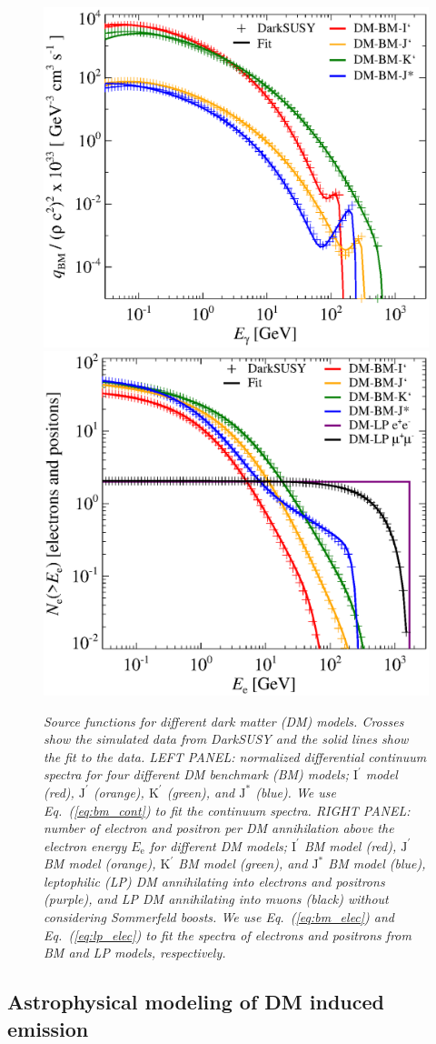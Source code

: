 \documentclass[10pt,aps,pra,reprint,amsmath,amsfonts,amssymb,showpacs,nofootinbib,floatfix]{revtex4-1}
\newcommand{\rmn}{\mathrm}
\newcommand{\ee}{E_\rmn{e}}
\newcommand{\Kp}{\rmn{K}^\prime}
\newcommand{\Ip}{\rmn{I}^\prime}
\newcommand{\Js}{\rmn{J}^*}
\newcommand{\Jp}{\rmn{J}^\prime}
\begin{document}
\begin{figure}
\begin{minipage}{2.0\columnwidth}
 \includegraphics[width=0.49\columnwidth]{figures/fit.ds.flux.eps}
 \includegraphics[width=0.49\columnwidth]{figures/fit.epflux.int.eps}
 \caption{\it Source functions for different dark matter (DM)
   models. Crosses show the simulated data from {\sc DarkSUSY} and the
   solid lines show the fit to the data. LEFT PANEL: normalized
   differential continuum spectra for four different DM benchmark (BM)
   models; $\Ip$ model (red), $\Jp$ (orange), $\Kp$ (green), and $\Js$
   (blue). We use Eq.~(\ref{eq:bm_cont}) to fit the continuum
   spectra. RIGHT PANEL: number of electron and positron per DM
   annihilation above the electron energy $\ee$ for different DM
   models; $\Ip$ BM model (red), $\Jp$ BM model (orange), $\Kp$ BM
   model (green), and $\Js$ BM model (blue), leptophilic (LP) DM
   annihilating into electrons and positrons (purple), and LP DM
   annihilating into muons (black) without considering Sommerfeld
   boosts. We use Eq.~(\ref{eq:bm_elec}) and Eq.~(\ref{eq:lp_elec}) to
   fit the spectra of electrons and positrons from BM and LP models,
   respectively.}
 \label{fig:q_DM}
\end{minipage}
\end{figure}


\subsection{Astrophysical modeling of DM induced emission}
\label{sect:AP}
\end{document}

